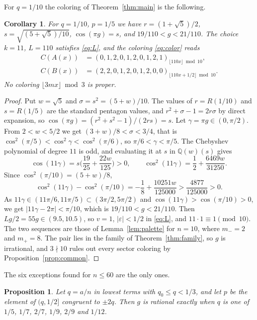 \documentclass[11pt]{amsart}
\newtheorem{corollary}[theorem]{Corollary}
\newtheorem{proposition}[theorem]{Proposition}
\theoremstyle{remark}
\numberwithin{equation}{section}
\begin{document}
For $q=1/10$ the coloring of Theorem~\ref{thm:main} is the following.

\begin{corollary}\label{cor:tenth}
For $q=1/10$, $p=1/5$ we have $r=(1+\sqrt5)/2$, $s=\sqrt{(5+\sqrt5)/10}$,
$\cos(\pi g)=s$, and $19/110<g<21/110$. The choice $k=11$, $L=110$
satisfies \eqref{eq:L}, and the coloring \eqref{eq:color} reads
\[
\begin{aligned}
C(A(x))&=(0,1,2,0,1,2,0,1,2,1)_{\lfloor110x\rfloor\bmod10},\\
C(B(x))&=(2,2,0,1,2,0,1,2,0,0)_{\lfloor110x+1/2\rfloor\bmod10}.
\end{aligned}
\]
No coloring $\lfloor3mx\rfloor\bmod3$ is proper.
\end{corollary}

\begin{proof}
Put $w=\sqrt5$ and $\sigma=s^2=(5+w)/10$. The values of $r=R(1/10)$ and
$s=R(1/5)$ are the standard pentagon values, and $r^2+\sigma-1=2r\sigma$ by direct
expansion, so $\cos(\pi g)=(r^2+s^2-1)/(2rs)=s$. Let $\gamma=\pi g\in(0,\pi/2)$.
From $2<w<5/2$ we get $(3+w)/8<\sigma<3/4$, that is $\cos^2(\pi/5)<\cos^2\gamma<\cos^2(\pi/6)$,
so $\pi/6<\gamma<\pi/5$. The Chebyshev polynomial of degree $11$ is odd, and
evaluating it at $s$ in $\mathbb Q(w)(s)$ gives
\[
\cos(11\gamma)=s\Big(\frac{19}{25}+\frac{22w}{125}\Big)>0,\qquad
\cos^2(11\gamma)=\frac12+\frac{6469w}{31250}.
\]
Since $\cos^2(\pi/10)=(5+w)/8$,
\[
\cos^2(11\gamma)-\cos^2(\pi/10)=-\frac18+\frac{10251w}{125000}>\frac{4877}{125000}>0 .
\]
As $11\gamma\in(11\pi/6,11\pi/5)\subset(3\pi/2,5\pi/2)$ and $\cos(11\gamma)>\cos(\pi/10)>0$,
we get $|11\gamma-2\pi|<\pi/10$, which is $19/110<g<21/110$. Then
$Lg/2=55g\in(9.5,10.5)$, so $v=1$, $|\varepsilon|<1/2$ in \eqref{eq:L},
and $11\cdot1\equiv1\pmod{10}$. The two sequences are those of
Lemma~\ref{lem:palette} for $n=10$, where $m_-=2$ and $m_+=8$. The pair lies in the
family of Theorem~\ref{thm:family}, so $g$ is irrational, and $3\nmid10$
rules out every sector coloring by Proposition~\ref{prop:common}.
\end{proof}

The six exceptions found for $n\le60$ are the only ones.

\begin{proposition}\label{prop:rational}
Let $q=a/n$ in lowest terms with $q_0\le q<1/3$, and let $p$ be the
element of $(q,1/2]$ congruent to $\pm2q$. Then $g$ is rational exactly
when $q$ is one of $1/5$, $1/7$, $2/7$, $1/9$, $2/9$ and $1/12$.
\end{proposition}
\end{document}
